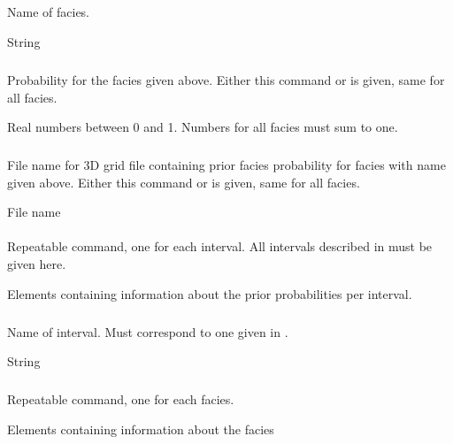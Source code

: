 {\subparagraph{}
 \slist
   \item \Description Name of facies.
   \item \Argument String
   \item \Default
 \elist

\subparagraph{}
 \slist
   \item \Description Probability for the facies given above. Either this command or  is given, same for all facies.
   \item \Argument Real numbers between 0 and 1. Numbers for all facies must sum to one.
   \item \Default
 \elist

\subparagraph{}
 \slist
   \item \Description File name for 3D grid file containing prior facies
     probability for facies with name given above. Either this command
     or  is given, same for all facies.
   \item \Argument File name
   \item \Default
 \elist

\paragraph{}
 \slist
   \item \Description Repeatable command, one for each interval. All intervals described in  must be given here.
   \item \Argument Elements containing information about the prior probabilities per interval.
   \item \Default
 \elist

\subparagraph{}
 \slist
   \item \Description Name of interval. Must correspond to one given in .
   \item \Argument String
   \item \Default
 \elist

\subparagraph{}
 \slist
   \item \Description Repeatable command, one for each facies.
   \item \Argument Elements containing information about the facies
   \item \Default
 \elist

}
